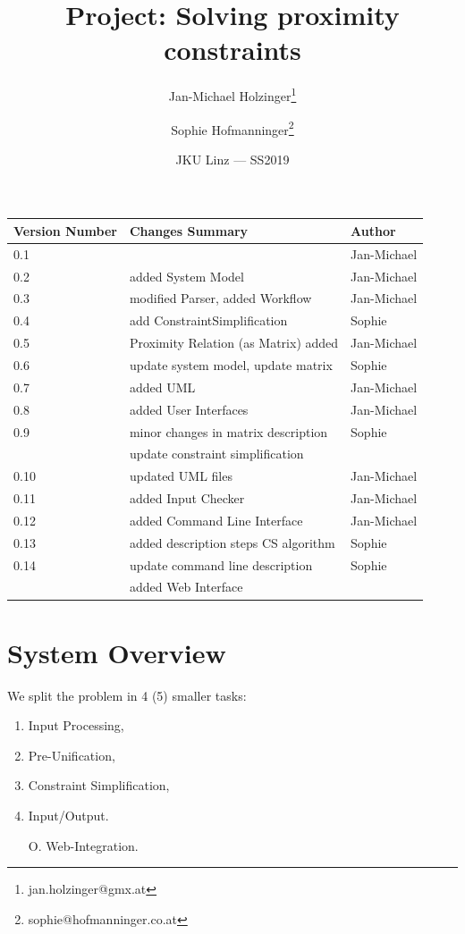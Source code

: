 \documentclass{article}
\title{Project: Solving proximity constraints} %
\author{Jan-Michael Holzinger\thanks{jan.holzinger@gmx.at} \and Sophie Hofmanninger\thanks{sophie@hofmanninger.co.at}} %
\date{JKU Linz --- SS2019} %
\begin{document}
\maketitle %


\begin{center}
\begin{tabular}[h]{|l|l|l|}
\hline
Version Number & Changes Summary & Author\\
\hline
0.1 & & Jan-Michael\\
\hline
0.2 & added System Model & Jan-Michael\\
\hline
0.3 & modified Parser, added Workflow & Jan-Michael\\
\hline
0.4 & add ConstraintSimplification & Sophie\\
\hline
0.5 & Proximity Relation (as Matrix) added & Jan-Michael\\
\hline
0.6 & update system model, update matrix & Sophie\\
\hline
0.7 & added UML & Jan-Michael\\
\hline
0.8 & added User Interfaces & Jan-Michael\\
\hline
0.9 & minor changes in matrix description & Sophie\\
& update constraint simplification&\\
\hline
0.10 & updated UML files & Jan-Michael\\
\hline
0.11 & added Input Checker & Jan-Michael\\
\hline
0.12 & added Command Line Interface & Jan-Michael\\
\hline
0.13 & added description steps CS algorithm & Sophie\\
\hline
0.14 & update command line description & Sophie\\
& added Web Interface&\\
\hline
\end{tabular}

\end{center}
\section{System Overview}

We split the problem in 4 (5) smaller tasks:
\begin{enumerate}
	\item Input Processing,
	\item Pre-Unification,
	\item Constraint Simplification,
	\item Input/Output.
	\item [O.] Web-Integration.
\end{enumerate}
\end{document}
